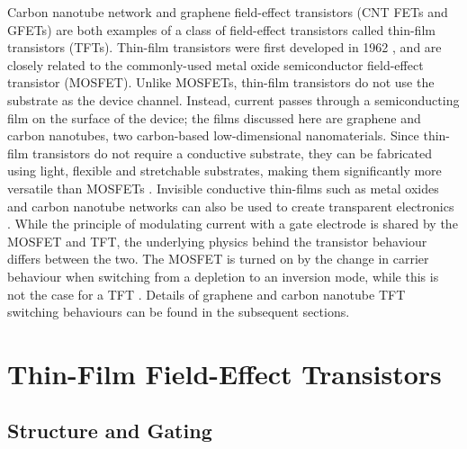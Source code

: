 \documentclass[
  a4paper,
]{scrbook}
\begin{document}
Carbon nanotube network and graphene field-effect transistors (CNT FETs
and GFETs) are both examples of a class of field-effect transistors
called thin-film transistors (TFTs). Thin-film transistors were first
developed in 1962 \autocite{Weimer1962}, and are closely related to the
commonly-used metal oxide semiconductor field-effect transistor
(MOSFET). Unlike MOSFETs, thin-film transistors do not use the substrate
as the device channel. Instead, current passes through a semiconducting
film on the surface of the device; the films discussed here are graphene
and carbon nanotubes, two carbon-based low-dimensional nanomaterials.
Since thin-film transistors do not require a conductive substrate, they
can be fabricated using light, flexible and stretchable substrates,
making them significantly more versatile than MOSFETs
\autocite{Kauffman2008,Cao2009,Petti2016,Shkodra2021}. Invisible
conductive thin-films such as metal oxides and carbon nanotube networks
can also be used to create transparent electronics \autocite{Cao2009}.
While the principle of modulating current with a gate electrode is
shared by the MOSFET and TFT, the underlying physics behind the
transistor behaviour differs between the two. The MOSFET is turned on by
the change in carrier behaviour when switching from a depletion to an
inversion mode, while this is not the case for a TFT
\autocite{Petti2016}. Details of graphene and carbon nanotube TFT
switching behaviours can be found in the subsequent sections.

\hypertarget{sec-general-FETs}{%
\section{Thin-Film Field-Effect Transistors}\label{sec-general-FETs}}

\hypertarget{sec-gating}{%
\subsection{Structure and Gating}\label{sec-gating}}
\end{document}
